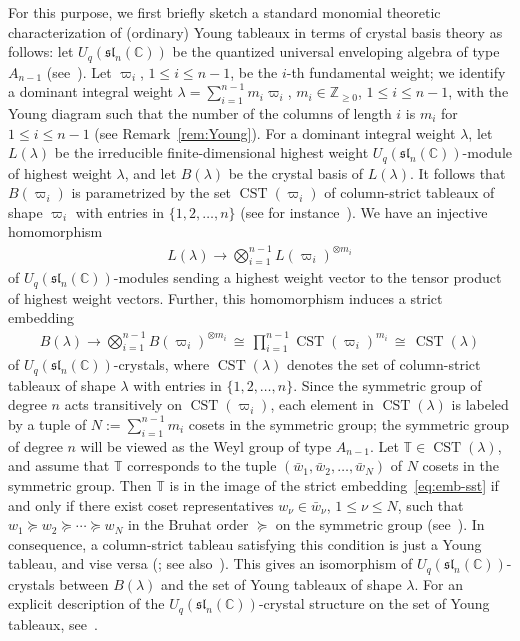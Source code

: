 \documentclass[10pt]{amsart}
\theoremstyle{definition}\newtheorem{defi}[theo]{Definition}
\theoremstyle{remark}\newtheorem{rema}[theo]{Remark}
\newcommand{\BC}{\mathbb{C}}
\newcommand{\BZ}{\mathbb{Z}}
\DeclareMathOperator{\CST}{CST}
\begin{document}
For this purpose, 
we first briefly sketch a standard monomial theoretic characterization 
of (ordinary) Young tableaux 
in terms of crystal basis theory as follows: 
let 
$U_q(\mathfrak{sl}_n(\BC))$ 
be the quantized universal enveloping algebra of type $A_{n-1}$ (see~\cite[\S~4.8 TABLE Fin]{Kac}).
Let $\varpi_i$, $1 \leq i \leq n-1$, be the $i$-th fundamental weight; 
we identify a dominant integral weight 
$\lambda = \sum_{i=1}^{n-1} m_i \varpi_i$, 
$m_i \in \BZ_{\geq 0}$, $1 \leq i \leq n-1$, 
with the Young diagram such that 
the number of the columns of length $i$ is $m_i$ for $1 \leq i \leq n-1$
(see Remark~\ref{rem:Young}). 
For a dominant integral weight 
$\lambda$, 
let 
$L(\lambda)$ 
be the irreducible finite-dimensional highest weight 
$U_q(\mathfrak{sl}_n(\BC))$-module of highest weight 
$\lambda$, 
and let 
$B(\lambda)$ 
be the crystal basis of 
$L(\lambda)$. 
It follows that 
$B(\varpi_i)$ 
is parametrized by the set 
$\CST (\varpi_i)$ 
of column-strict tableaux of shape 
$\varpi_i$
with entries in 
$\{ 1,2,\ldots ,n \}$
(see for instance~\cite[Proposition~3.3.1~(i)]{KN}). 
We have an injective homomorphism 
\begin{align} \label{eq:emb-hwm}
L(\lambda) \longrightarrow \bigotimes_{i=1}^{n-1} L(\varpi_i)^{\otimes m_i}
\end{align}
of $U_q(\mathfrak{sl}_n(\BC))$-modules 
sending a highest weight vector to the tensor product of highest weight vectors. 
Further, this homomorphism induces a strict embedding 
\begin{align} \label{eq:emb-sst}
B(\lambda) \longrightarrow \bigotimes_{i = 1}^{n-1} B(\varpi_i)^{\otimes m_i} 
\, \cong \, 
\prod_{i=1}^{n-1} \CST (\varpi_i)^{m_i}
\, \cong \, 
\CST (\lambda) 
\end{align}
of $U_q(\mathfrak{sl}_n(\BC))$-crystals, 
where 
$\CST (\lambda)$ 
denotes the set of column-strict tableaux of shape $\lambda$ with entries in $\{ 1,2,\ldots ,n \}$. 
Since the symmetric group of degree $n$ acts transitively on 
$\CST (\varpi_i)$, 
each element in 
$\CST (\lambda)$ 
is labeled by a tuple of 
$N := \sum_{i=1}^{n-1} m_i$ 
cosets in the symmetric group; 
the symmetric group of degree $n$ will be 
viewed as the Weyl group of type $A_{n-1}$. 
Let $\mathbb{T} \in \CST (\lambda)$, 
and assume that $\mathbb{T}$ corresponds to the tuple 
$(\bar{w}_1 , \bar{w}_2 , \ldots , \bar{w}_N)$
of $N$ cosets in the symmetric group. 
Then 
$\mathbb{T}$ 
is in the image of the strict embedding~\eqref{eq:emb-sst} 
if and only if there exist coset representatives 
$w_{\nu} \in \bar{w}_{\nu}$, $1 \leq \nu \leq N$, 
such that
$w_1 \succeq w_2 \succeq \cdots \succeq w_N$ 
in the Bruhat order $\succeq$ on the symmetric group
(see~\cite[Theorem~10.1]{L96}). 
In consequence, a column-strict tableau satisfying this condition 
is just a Young tableau, and vise versa
(\cite[Theorem~2.6.3 (Tableau Criterion)]{BB}; 
see also~\cite[Theorem~3.4.2~(i)]{KN}). 
This gives an isomorphism of 
$U_q(\mathfrak{sl}_n(\BC))$-crystals 
between 
$B(\lambda)$ 
and the set of Young tableaux of shape $\lambda$. 
For an explicit description of the $U_q(\mathfrak{sl}_n(\BC))$-crystal structure on
the set of Young tableaux, see~\cite[Theorem~3.4.2~(ii)]{KN}.
\end{document}
